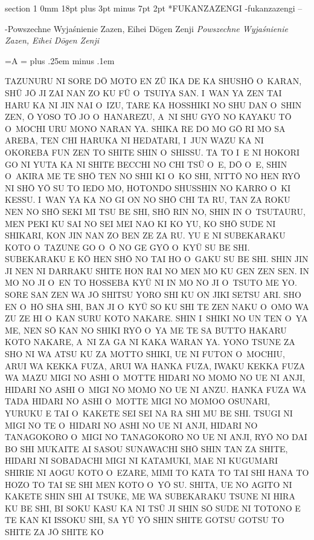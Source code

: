 \documentclass[12pt]{article}
\makeatletter
\renewcommand{\section}{\@startsection%
 {section}			%
 {1}				%
 {0mm}				%
 {18pt plus 3pt minus 7pt}	%
 { 2pt}				%
 {\bfseries}}			%
\newcounter{labelnum}
\newenvironment{Prayer}[4]{%
	\section*{#2}
	\ifx -#1
		\stepcounter{labelnum}\label{label.\arabic{labelnum}}\nopagebreak
	\else
		\label{#1}\nopagebreak
	\fi
	\ifx -#3
		\addcontentsline{toc}{section}{#2}
	\else
		\addcontentsline{toc}{section}{#3}
	\fi
	\ifx -#4
		{}
	\else
		\noindent\emph{#4}\par\nopagebreak
	\fi
	\begingroup
}
{\par\endgroup}
\newcommand{\wersaliki}{%
	\newbox\Abox
	\newdimen\Aspacja
	\setbox\Abox=\hbox{A}
	\Aspacja=\wd\Abox
	\spaceskip \Aspacja plus .25em minus .1em
}
\newenvironment{JAPANESE}
{
	\parindent	0pt
	\parfillskip	0pt
	\language 255
	\begingroup
	\wersaliki
	\par
}
{\par\endgroup}
\makeatother
\begin{document}
\begin{Prayer}{fukanzazengi}
	{FUKANZAZENGI}{-}
	{Powszechne Wyjaśnienie Zazen, Eihei D\=ogen Zenji}

\bigskip
\begin{JAPANESE}
TAZUNURU NI SORE D\=O MOTO EN Z\=U IKA DE KA SHUSH\=O O~KARAN, SH\=U J\=O
JI ZAI NAN ZO KU F\=U O~TSUIYA SAN. I~WAN YA ZEN TAI HARU KA NI JIN NAI
O~IZU, TARE KA HOSSHIKI NO SHU DAN O~SHIN ZEN, \=O YOSO T\=O JO O~HANAREZU,
A~NI SHU GY\=O NO KAYAKU T\=O O~MOCHI URU MONO NARAN YA. SHIKA RE DO MO
G\=O RI MO SA AREBA, TEN CHI HARUKA NI HEDATARI, I~JUN WAZU KA NI OKOREBA
FUN ZEN TO SHITE SHIN O~SHISSU. TA TO I~E NI HOKORI GO NI YUTA KA NI SHITE
BECCHI NO CHI TS\=U O~E, D\=O O~E, SHIN O~AKIRA ME TE SH\=O TEN NO SHII KI
O~KO SHI, NITT\=O NO HEN RY\=O NI SH\=O Y\=O SU TO IEDO MO, HOTONDO
SHUSSHIN NO KARRO O~KI KESSU. I~WAN YA KA NO GI ON NO SH\=O CHI TA RU, TAN
ZA ROKU NEN NO SH\=O SEKI MI TSU BE SHI, SH\=O RIN NO, SHIN IN O~TSUTAURU,
MEN PEKI KU SAI NO SEI MEI NAO KI KO YU, KO SH\=O SUDE NI SHIKARI, KON JIN
NAN ZO BEN ZE ZA RU. YU E NI SUBEKARAKU KOTO O~TAZUNE GO O~\=O NO GE GY\=O
O~KY\=U SU BE SHI. SUBEKARAKU E K\=O HEN SH\=O NO TAI HO O~GAKU SU BE SHI.
SHIN JIN JI NEN NI DARRAKU SHITE HON RAI NO MEN MO KU GEN ZEN SEN. IN MO NO
JI O~EN TO HOSSEBA KY\=U NI IN MO NO JI O~TSUTO ME YO. SORE SAN ZEN WA J\=O
SHITSU YORO SHI KU ON JIKI SETSU ARI. SHO EN O~H\=O SHA SHI, BAN JI O~KY\=U
SO KU SHI TE ZEN NAKU O~OMO WA ZU ZE HI O~KAN SURU KOTO NAKARE. SHIN
I~SHIKI NO UN TEN O~YA ME, NEN S\=O KAN NO SHIKI RY\=O O~YA ME TE SA BUTTO
HAKARU KOTO NAKARE, A~NI ZA GA NI KAKA WARAN YA. YONO TSUNE ZA SHO NI WA
ATSU KU ZA MOTTO SHIKI, UE NI FUTON O~MOCHIU, ARUI WA KEKKA FUZA, ARUI WA
HANKA FUZA, IWAKU KEKKA FUZA WA MAZU MIGI NO ASHI O~MOTTE HIDARI NO MOMO NO
UE NI ANJI, HIDARI NO ASHI O~MIGI NO MOMO NO UE NI ANZU. HANKA FUZA WA TADA
HIDARI NO ASHI O~MOTTE MIGI NO MOMOO OSUNARI, YURUKU E TAI O~KAKETE SEI SEI
NA RA SHI MU BE SHI. TSUGI NI MIGI NO TE O~HIDARI NO ASHI NO UE NI ANJI,
HIDARI NO TANAGOKORO O~MIGI NO TANAGOKORO NO UE NI ANJI, RY\=O NO DAI BO
SHI MUKAITE AI SASOU SUNAWACHI SH\=O SHIN TAN ZA SHITE, HIDARI NI SOBADACHI
MIGI NI KATAMUKI, MAE NI KUGUMARI SHIRIE NI AOGU KOTO O~EZARE, MIMI TO KATA
TO TAI SHI HANA TO HOZO TO TAI SE SHI MEN KOTO O~Y\=O SU. SHITA, UE NO
AGITO NI KAKETE SHIN SHI AI TSUKE, ME WA SUBEKARAKU TSUNE NI HIRA KU BE
SHI, BI SOKU KASU KA NI TS\=U JI SHIN S\=O SUDE NI TOTONO E TE KAN KI
ISSOKU SHI, SA Y\=U Y\=O SHIN SHITE GOTSU GOTSU TO SHITE ZA J\=O SHITE KO

\end{JAPANESE}
\end{Prayer}
\end{document}
